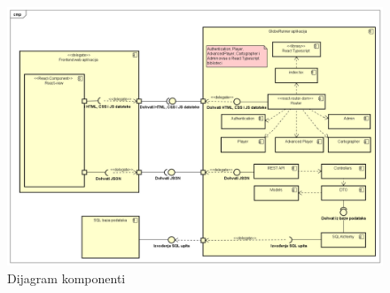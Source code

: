 			 \begin{figure}[H]
        			\includegraphics[width=\textwidth]{slike/dijagramKomponenti.png}
        			\centering
        			\caption{Dijagram komponenti}
        			\label{fig:dijagramKomponenti}
        		\end{figure}